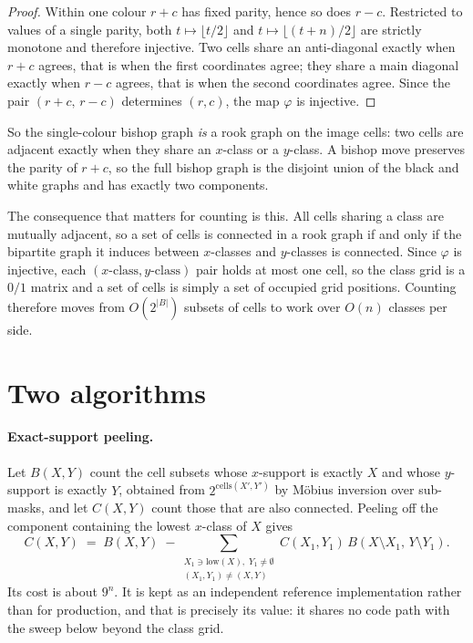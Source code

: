 \documentclass[11pt]{article}
\theoremstyle{remark}
\begin{document}
\begin{proof}
Within one colour $r+c$ has fixed parity, hence so does $r-c$. Restricted to
values of a single parity, both $t \mapsto \lfloor t/2 \rfloor$ and
$t \mapsto \lfloor (t+n)/2 \rfloor$ are strictly monotone and therefore
injective. Two cells share an anti-diagonal exactly when $r+c$ agrees, that is
when the first coordinates agree; they share a main diagonal exactly when $r-c$
agrees, that is when the second coordinates agree. Since the pair $(r+c,\,r-c)$
determines $(r,c)$, the map $\varphi$ is injective.
\end{proof}

So the single-colour bishop graph \emph{is} a rook graph on the image cells:
two cells are adjacent exactly when they share an $x$-class or a $y$-class. A
bishop move preserves the parity of $r+c$, so the full bishop graph is the
disjoint union of the black and white graphs and has exactly two components.

The consequence that matters for counting is this. All cells sharing a class are
mutually adjacent, so a set of cells is connected in a rook graph if and only if
the bipartite graph it induces between $x$-classes and $y$-classes is connected.
Since $\varphi$ is injective, each $(x\text{-class}, y\text{-class})$ pair holds
at most one cell, so the class grid is a $0/1$ matrix and a set of cells is
simply a set of occupied grid positions. Counting therefore moves from
$O(2^{|B|})$ subsets of cells to work over $O(n)$ classes per side.

\section{Two algorithms}

\paragraph{Exact-support peeling.}
Let $B(X,Y)$ count the cell subsets whose $x$-support is exactly $X$ and whose
$y$-support is exactly $Y$, obtained from $2^{\mathrm{cells}(X',Y')}$ by
M\"obius inversion over sub-masks, and let $C(X,Y)$ count those that are also
connected. Peeling off the component containing the lowest $x$-class of $X$
gives
\[
  C(X,Y) \;=\; B(X,Y) \;-\!\!\sum_{\substack{X_1 \ni \mathrm{low}(X),\; Y_1 \neq \emptyset \\ (X_1,Y_1) \neq (X,Y)}}\!\! C(X_1,Y_1)\, B(X \setminus X_1,\, Y \setminus Y_1).
\]
Its cost is about $9^n$. It is kept as an independent reference implementation
rather than for production, and that is precisely its value: it shares no code
path with the sweep below beyond the class grid.
\end{document}
